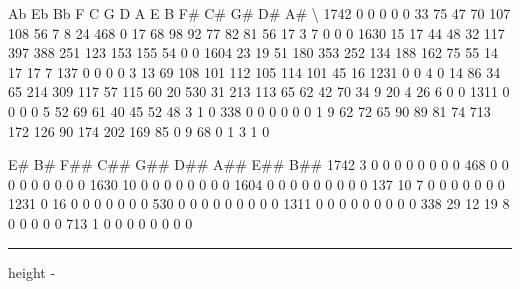 \documentclass[letterpaper,10pt,english]{sphinxmanual}
\newlength\nbsphinxcodecellspacing
\begin{document}
{\begin{sphinxVerbatim}[commandchars=\\\{\}]
       Ab   Eb   Bb    F    C    G    D    A    E    B   F\#   C\#   G\#  D\#  A\#  \textbackslash{}
1742    0    0    0    0    0   33   75   47   70  107  108   56    7   8  24
468     0   17   68   98   92   77   82   81   56   17    3    7    0   0   0
1630   15   17   44   48   32  117  397  388  251  123  153  155   54   0   0
1604   23   19   51  180  353  252  134  188  162   75   55   14   17  17   7
137     0    0    0    0    3   13   69  108  101  112  105  114  101  45  16
1231    0    0    4    0   14   86   34   65  214  309  117   57  115  60  20
530    31  213  113   65   62   42   70   34    9   20    4   26    6   0   0
1311    0    0    0    0    5   52   69   61   40   45   52   48    3   1   0
338     0    0    0    0    0    0    1    9   62   72   65   90   89  81  74
713   172  126   90  174  202  169   85    0    9   68    0    1    3   1   0

      E\#  B\#  F\#\#  C\#\#  G\#\#  D\#\#  A\#\#  E\#\#  B\#\#
1742   3   0    0    0    0    0    0    0    0
468    0   0    0    0    0    0    0    0    0
1630  10   0    0    0    0    0    0    0    0
1604   0   0    0    0    0    0    0    0    0
137   10   7    0    0    0    0    0    0    0
1231   0  16    0    0    0    0    0    0    0
530    0   0    0    0    0    0    0    0    0
1311   0   0    0    0    0    0    0    0    0
338   29  12   19    8    0    0    0    0    0
713    1   0    0    0    0    0    0    0    0
\end{sphinxVerbatim}
}

{
\begin{sphinxVerbatim}[commandchars=\\\{\}]
\llap{\color{nbsphinxin}[8]:\,\hspace{\fboxrule}\hspace{\fboxsep}}\PYG{p}{[}\PYG{p}{]}   
\end{sphinxVerbatim}
}

\hrule height -\fboxrule\relax
\vspace{\nbsphinxcodecellspacing}
\end{document}
